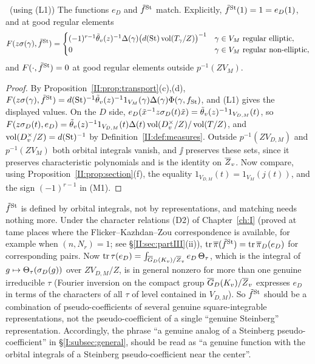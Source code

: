 \begin{proposition}\label{II:prop:eD}\ (using (L1))
The functions $e_D$ and $\tilde f^{\mathrm{St}}$ match. Explicitly, $\tilde f^{\mathrm{St}}(1)=1=e_D(1)$, and at good regular elements
\[ F(z\sigma(\gamma),\tilde f^{\mathrm{St}})=\begin{cases}(-1)^{r-1}\tilde\theta_v(z)^{-1}\Delta(\gamma)\big(d(\mathrm{St})\operatorname{vol}(T_\gamma/Z)\big)^{-1}&\gamma\in V_M\text{ regular elliptic},\\ 0&\gamma\in V_M\text{ regular non-elliptic},\end{cases} \]
and $F(\cdot,\tilde f^{\mathrm{St}})=0$ at good regular elements outside $p^{-1}(ZV_M)$.
\end{proposition}
\begin{proof}
By Proposition~\ref{II:prop:transport}(c),(d), $F(z\sigma(\gamma),\tilde f^{\mathrm{St}})=d(\mathrm{St})^{-1}\tilde\theta_v(z)^{-1}1_{V_M}(\gamma)\Delta(\gamma)\Phi(\gamma,f_{\mathrm{St}})$, and (L1) gives the displayed values. On the $D$ side, $e_D(\tilde x^{-1}z\sigma_D(t)\tilde x)=\tilde\theta_v(z)^{-1}1_{V_{D,M}}(t)$, so $F(z\sigma_D(t),e_D)=\tilde\theta_v(z)^{-1}1_{V_{D,M}}(t)\Delta(t)\operatorname{vol}(D_v^\times/Z)/\operatorname{vol}(T/Z)$, and $\operatorname{vol}(D_v^\times/Z)=d(\mathrm{St})^{-1}$ by Definition~\ref{II:def:measures}. Outside $p^{-1}(ZV_{D,M})$ and $p^{-1}(ZV_M)$ both orbital integrals vanish, and $\jj$ preserves these sets, since it preserves characteristic polynomials and is the identity on $\overline{Z}_v$. Now compare, using Proposition~\ref{II:prop:section}(f), the equality $1_{V_{D,M}}(t)=1_{V_M}(j(t))$, and the sign $(-1)^{r-1}$ in (M1).
\end{proof}

\begin{remark}\label{II:rem:notpc}
$\tilde f^{\mathrm{St}}$ is defined by orbital integrals, not by representations, and matching needs nothing more. Under the character relations (D2) of Chapter~\ref{ch:I} (proved at tame places where the Flicker--Kazhdan--Zou correspondence is available, for example when $(n,N_r)=1$; see \S\ref{II:sec:partIII}(ii)), $\operatorname{tr}\overline{\pi}(\tilde f^{\mathrm{St}})=\operatorname{tr}\overline{\pi}_D(e_D)$ for corresponding pairs. Now $\operatorname{tr}\tau(e_D)=\int_{\overline{G}_D(K_v)/\overline{Z}_v}e_D\,\Theta_\tau$, which is the integral of $g\mapsto\Theta_\tau(\sigma_D(g))$ over $ZV_{D,M}/Z$, is in general nonzero for more than one genuine irreducible $\tau$ (Fourier inversion on the compact group $\overline{G}_D(K_v)/\overline{Z}_v$ expresses $e_D$ in terms of the characters of all $\tau$ of level contained in $V_{D,M}$). So $\tilde f^{\mathrm{St}}$ should be a combination of pseudo-coefficients of several genuine square-integrable representations, not the pseudo-coefficient of a single ``genuine Steinberg'' representation. Accordingly, the phrase ``a genuine analog of a Steinberg pseudo-coefficient'' in \S\ref{I:subsec:general}, should be read as ``a genuine function with the orbital integrals of a Steinberg pseudo-coefficient near the center''.
\end{remark}

